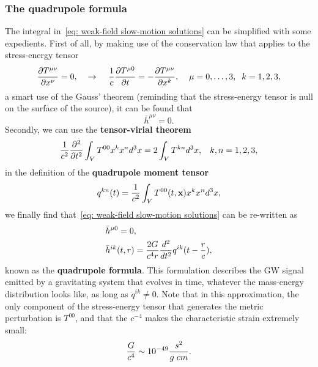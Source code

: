 \subsubsection{The quadrupole formula}
The integral in~\eqref{eq: weak-field slow-motion solutions} can be simplified with some expedients. 
First of all, by making use of the conservation law that applies to the stress-energy tensor
\[
    \frac{\partial T^{\mu\nu}}{\partial x^\nu}=0, \hspace{4mm} \to \hspace{4mm} \frac{1}{c}\frac{\partial T^{\mu 0}}{\partial t} = - \frac{\partial T^{\mu\nu}}{\partial x^k}, \hspace{4mm} \mu=0,\dots,3,\hspace{2mm} k=1,2,3,
\]
a smart use of the Gauss' theorem (reminding that the stress-energy tensor is null on the surface of the source), it can be found that 
\[
    \bar{h}^{\mu\nu}=0.
\]
Secondly, we can use the \textbf{tensor-virial theorem}
\begin{equation}
    \frac{1}{c^2}\frac{\partial^2}{\partial t^2}\int_V T^{00}x^k x^n d^3x = 2\int_V T^{kn}d^3x, \hspace{3mm} k,n=1,2,3,
    \notag
\end{equation}
in the definition of the \textbf{quadrupole moment tensor}
\begin{equation}
    q^{kn}(t) = \frac{1}{c^2}\int_V T^{00}(t,\mathbf{x})x^k x^n d^3x,
    \notag
\end{equation}
we finally find that~\eqref{eq: weak-field slow-motion solutions} can be re-written as
\begin{align}
    &\bar{h}^{\mu 0} =0,\notag\\
    &\bar{h}^{ik}(t,r) = \frac{2G}{c^4r}\frac{d^2}{dt^2}q^{ik}(t-\frac{r}{c}),
    \label{eq: quadrupole formula}
\end{align}
known as the \textbf{quadrupole formula}.
This formulation describes the GW signal emitted by a gravitating system that evolves in time, whatever the mass-energy distribution looks like, as long as $\ddot{q}^{ik}\not = 0$.
Note that in this approximation, the only component of the stress-energy tensor that generates the metric perturbation is $T^{00}$, and that the $c^{-4}$ makes the characteristic strain extremely small:
\[
    \frac{G}{c^4}\sim 10^{-49}\frac{s^2}{g\hspace{1mm}cm}.
\]

